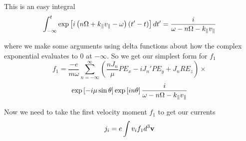 This is an easy integral
\begin{equation}
	\int_{-\infty}^t \exp \left[i\left(n\Omega + k_\parallel v_\parallel - \omega\right) \left(t' - t\right)\right] dt' = \frac{i}{\omega-n\Omega-k_\parallel v_\parallel}
\end{equation}

where we make some arguments using delta functions about how the complex exponential evaluates to 0 at $-\infty$. So we get our simplest form for $f_1$
\begin{equation*}
	f_1 = \frac{-e}{m \omega} \sum_{n=-\infty}^\infty \left(\frac{nJ_n}{\mu} P E_x - i J_n' P E_y + J_n R E_z \right) \times
\end{equation*}
\begin{equation}
	\exp \left[-i\mu \sin\theta \right] \exp \left[in \theta \right] \frac{i}{\omega-n\Omega-k_\parallel v_\parallel}
\end{equation}

Now we need to take the first velocity moment $f_1$ to get our currents
\begin{equation}
	j_i = e \int v_i f_1 d^3 \textbf{v}
\end{equation}

